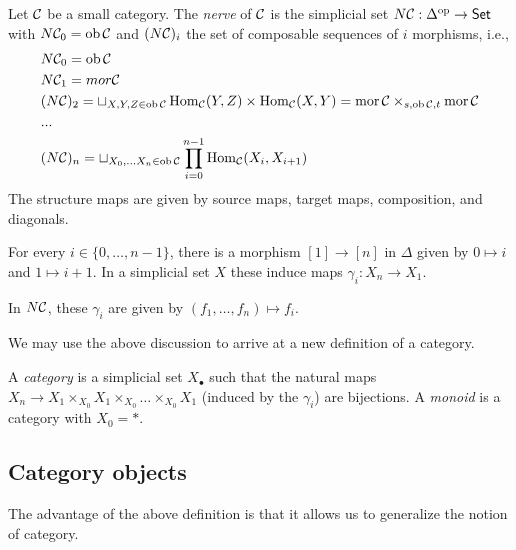 \begin{ex}
	Let $\mathcal{C}$ be a small category.
	The \emph{nerve} of $\mathcal{C}$ is the simplicial set $N\mathcal{C}: \Delta^{\mathrm{op}} \to \mathsf{Set}$ with $N\mathcal{C}_0 = \operatorname{ob} \mathcal{C}$ and $(N \mathcal{C})_i$ the set of composable sequences of $i$ morphisms, i.e.,
	\begin{equation*}
		\begin{aligned}
			&N\mathcal{C}_0 = \operatorname{ob} \mathcal{C} \\
			&N\mathcal{C}_1 = mor \mathcal{C} \\
			&(N\mathcal{C})_2 = \sqcup_{X,Y,Z \in \operatorname{ob} \mathcal{C}} \operatorname{Hom}_{\mathcal{C}}(Y, Z) \times \operatorname{Hom}_{\mathcal{C}}(X, Y) = \operatorname{mor} \mathcal{C} \times_{s,\operatorname{ob} \mathcal{C},t} \operatorname{mor} \mathcal{C} \\
			&...\\
			&(N\mathcal{C})_n = \sqcup_{X_0,...X_n \in \operatorname{ob} \mathcal{C}} \prod_{i=0}^{n-1} \operatorname{Hom}_{\mathcal{C}}(X_i, X_{i+1})
		\end{aligned}
	\end{equation*}
	The structure maps are given by source maps, target maps, composition, and diagonals.
\end{ex}

For every $i \in \{0, \dots, n-1\}$, there is a morphism $[1] \to [n]$ in $\Delta$ given by $0 \mapsto i$ and $1 \mapsto i+1$.
In a simplicial set $X$ these induce maps $\gamma_i: X_n \to X_1$.

\begin{ex}
	In $N \mathcal{C}$, these $\gamma_i$ are given by $(f_1, \dots, f_n) \mapsto f_i$.
\end{ex}

We may use the above discussion to arrive at a new definition of a category.

\begin{dfn}
	A \emph{category} is a simplicial set $X_\bullet$ such that the natural maps $X_n \to X_1 \times_{X_0} X_1 \times_{X_0} \dots \times_{X_0} X_1$ (induced by the $\gamma_i$) are bijections.
	A \emph{monoid} is a category with $X_0 = *$.
\end{dfn}

\subsection{Category objects}

The advantage of the above definition is that it allows us to generalize the notion of category.

